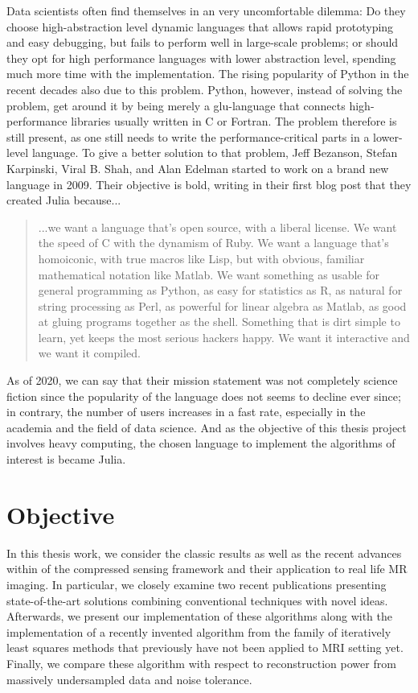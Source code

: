 Data scientists often find themselves in an very uncomfortable dilemma: Do they choose high-abstraction level dynamic languages that allows rapid prototyping and easy debugging, but fails to perform well in large-scale problems; or should they opt for high performance languages with lower abstraction level, spending much more time with the implementation. The rising popularity of Python in the recent decades also due to this problem. Python, however, instead of solving the problem, get around it by being merely a glu-language that connects high-performance libraries usually written in C or Fortran. The problem therefore is still present, as one still needs to write the performance-critical parts in a lower-level language. To give a better solution to that problem, Jeff Bezanson, Stefan Karpinski, Viral B. Shah, and Alan Edelman started to work on a brand new language in 2009. Their objective is bold, writing in their first blog post that they created Julia because...
\begin{quote}
...we want a language that's open source, with a liberal license. We want the speed of C with the dynamism of Ruby. We want a language that's homoiconic, with true macros like Lisp, but with obvious, familiar mathematical notation like Matlab. We want something as usable for general programming as Python, as easy for statistics as R, as natural for string processing as Perl, as powerful for linear algebra as Matlab, as good at gluing programs together as the shell. Something that is dirt simple to learn, yet keeps the most serious hackers happy. We want it interactive and we want it compiled.~\cite{bezanson_why_2012}
\end{quote}

As of 2020, we can say that their mission statement was not completely science fiction since the popularity of the language does not seems to decline ever since; in contrary, the number of users increases in a fast rate, especially in the academia and the field of data science. And as the objective of this thesis project involves heavy computing, the chosen language to implement the algorithms of interest is became Julia.

\section{Objective}

In this thesis work, we consider the classic results as well as the recent advances within of the compressed sensing framework and their application to real life MR imaging. In particular, we closely examine two recent publications presenting state-of-the-art solutions combining conventional techniques with novel ideas. Afterwards, we present our implementation of these algorithms along with the implementation of a recently invented algorithm from the family of iteratively least squares methods that previously have not been applied to MRI setting yet. Finally, we compare these algorithm with respect to reconstruction power from massively undersampled data and noise tolerance.

